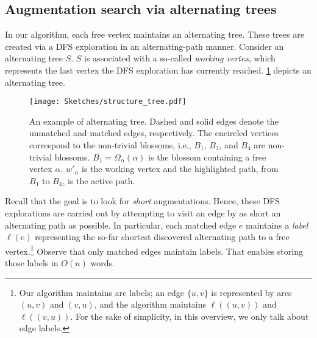 \documentclass{article}
\newcommand{\alp}{\alpha}
\newcommand{\Omg}{\Omega}
\begin{document}
\subsection{Augmentation search via alternating trees}
In our algorithm, each free vertex maintains an alternating tree. These trees are created via a DFS exploration in an alternating-path manner.
Consider an alternating tree $S$. $S$ is associated with a so-called \emph{working vertex}, which represents the last vertex the DFS exploration has currently reached. \cref{fig:alternating-tree} depicts an alternating tree.
\begin{figure}[h]
    \centering
    \texttt{[image: Sketches/structure\_tree.pdf]}
    \caption{An example of alternating tree. Dashed and solid edges denote the unmatched and matched edges, respectively.
    The encircled vertices correspond to the non-trivial blossoms, i.e., $B_1$, $B_3$, and $B_4$ are non-trivial blossoms.
    $B_1 = \Omg_\alp(\alp)$ is the blossom containing a free vertex $\alp$.
    $w'_\alp$ is the working vertex and the highlighted path, from $B_1$ to $B_4$, is the active path.
    }
    \label{fig:alternating-tree}
\end{figure}


Recall that the goal is to look for \emph{short} augmentations. Hence, these DFS explorations are carried out by attempting to visit an edge by as short an alternating path as possible. 
In particular, each matched edge $e$ maintains a \emph{label} $\ell(e)$ representing the so-far shortest discovered alternating path to a free vertex.\footnote{Our algorithm maintains arc labels; an edge $\{u, v\}$ is represented by arcs $(u, v)$ and $(v, u)$, and the algorithm maintains $\ell((u, v))$ and $\ell((v, u))$. For the sake of simplicity, in this overview, we only talk about edge labels.}
Observe that only matched edges maintain labels. That enables storing those labels in $O(n)$ words.
\end{document}
